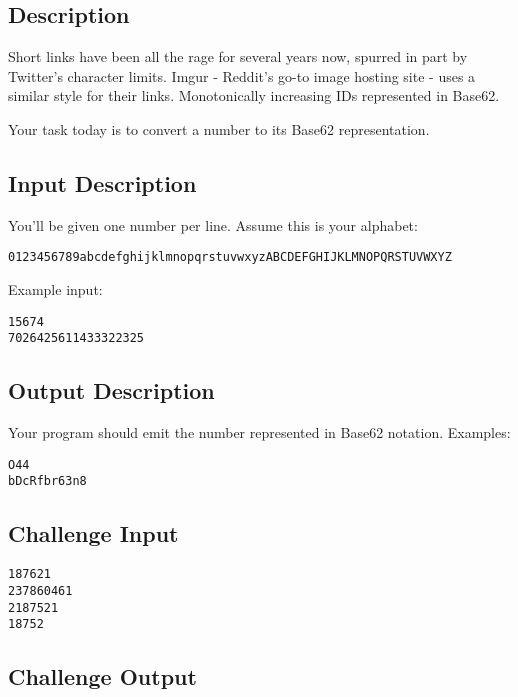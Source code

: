 \subsection*{Description}\label{description-15}

Short links have been all the rage for several years now, spurred in
part by Twitter's character limits. Imgur - Reddit's go-to image hosting
site - uses a similar style for their links. Monotonically increasing
IDs represented in Base62.

Your task today is to convert a number to its Base62 representation.

\subsection*{Input Description}\label{input-description-11}

You'll be given one number per line. Assume this is your alphabet:

\begin{lstlisting}
0123456789abcdefghijklmnopqrstuvwxyzABCDEFGHIJKLMNOPQRSTUVWXYZ 
\end{lstlisting}

Example input:

\begin{lstlisting}
15674
7026425611433322325
\end{lstlisting}

\subsection*{Output Description}\label{output-description-11}

Your program should emit the number represented in Base62 notation.
Examples:

\begin{lstlisting}
O44
bDcRfbr63n8
\end{lstlisting}

\subsection*{Challenge Input}\label{challenge-input-11}

\begin{lstlisting}
187621
237860461
2187521
18752
\end{lstlisting}

\subsection*{Challenge Output}\label{challenge-output-9}


